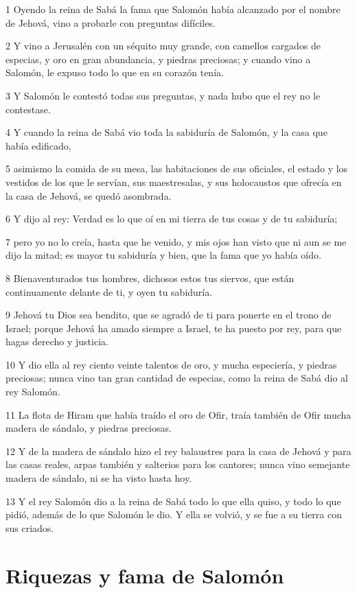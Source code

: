 \par 1 Oyendo la reina de Sabá la fama que Salomón había alcanzado por el nombre de Jehová, vino a probarle con preguntas difíciles.
\par 2 Y vino a Jerusalén con un séquito muy grande, con camellos cargados de especias, y oro en gran abundancia, y piedras preciosas; y cuando vino a Salomón, le expuso todo lo que en su corazón tenía.
\par 3 Y Salomón le contestó todas sus preguntas, y nada hubo que el rey no le contestase.
\par 4 Y cuando la reina de Sabá vio toda la sabiduría de Salomón, y la casa que había edificado,
\par 5 asimismo la comida de su mesa, las habitaciones de sus oficiales, el estado y los vestidos de los que le servían, sus maestresalas, y sus holocaustos que ofrecía en la casa de Jehová, se quedó asombrada.
\par 6 Y dijo al rey: Verdad es lo que oí en mi tierra de tus cosas y de tu sabiduría;
\par 7 pero yo no lo creía, hasta que he venido, y mis ojos han visto que ni aun se me dijo la mitad; es mayor tu sabiduría y bien, que la fama que yo había oído.
\par 8 Bienaventurados tus hombres, dichosos estos tus siervos, que están continuamente delante de ti, y oyen tu sabiduría.
\par 9 Jehová tu Dios sea bendito, que se agradó de ti para ponerte en el trono de Israel; porque Jehová ha amado siempre a Israel, te ha puesto por rey, para que hagas derecho y justicia.
\par 10 Y dio ella al rey ciento veinte talentos de oro,  y mucha especiería, y piedras preciosas; nunca vino tan gran cantidad de especias, como la reina de Sabá dio al rey Salomón.
\par 11 La flota de Hiram que había traído el oro de Ofir, traía también de Ofir mucha madera de sándalo, y piedras preciosas.
\par 12 Y de la madera de sándalo hizo el rey balaustres para la casa de Jehová y para las casas reales, arpas también y salterios para los cantores; nunca vino semejante madera de sándalo, ni se ha visto hasta hoy.
\par 13 Y el rey Salomón dio a la reina de Sabá todo lo que ella quiso, y todo lo que pidió, además de lo que Salomón le dio. Y ella se volvió, y se fue a su tierra con sus criados.

\section*{Riquezas y fama de Salomón}

